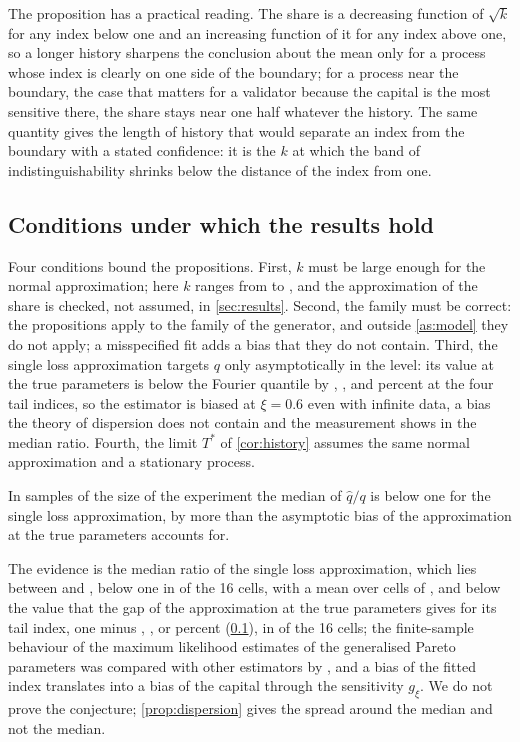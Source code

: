 The proposition has a practical reading. The share is a decreasing function of $\sqrt k$ for any index below one and an increasing function of it for any index above one, so a longer history sharpens the conclusion about the mean only for a process whose index is clearly on one side of the boundary; for a process near the boundary, the case that matters for a validator because the capital is the most sensitive there, the share stays near one half whatever the history.
The same quantity gives the length of history that would separate an index from the boundary with a stated confidence: it is the $k$ at which the band of indistinguishability shrinks below the distance of the index from one.

\subsection{Conditions under which the results hold}
\label{sec:theory-conditions}

Four conditions bound the propositions. First, $k$ must be large enough for the normal approximation; here $k$ ranges from \kMin{} to \kMax{}, and the approximation of the share is checked, not assumed, in \cref{sec:results}. Second, the family must be correct: the propositions apply to the family of the generator, and outside \cref{as:model} they do not apply; a misspecified fit adds a bias that they do not contain. Third, the single loss approximation targets $q$ only asymptotically in the level:
its value at the true parameters is below the Fourier quantile by \slGapA{}, \slGapB{}, \slGapC{} and \slGapD{} percent at the four tail indices, so the estimator is biased at $\xi=0.6$ even with infinite data, a bias the theory of dispersion does not contain and the measurement shows in the median ratio. Fourth, the limit $T^\ast$ of \cref{cor:history} assumes the same normal approximation and a stationary process.

\begin{conjecture}
\label{conj:bias}
In samples of the size of the experiment the median of $\hat q/q$ is below one for the single loss approximation, by more than the asymptotic bias of the approximation at the true parameters accounts for.
\end{conjecture}

The evidence is the median ratio of the single loss approximation, which lies between \slMedMin{} and \slMedMax{}, below one in \slBelowCells{} of the 16 cells, with a mean over cells of \slMeanMed{}, and below the value that the gap of the approximation at the true parameters gives for its tail index, one minus \slGapA{}, \slGapB{}, \slGapC{} or \slGapD{} percent (\cref{sec:theory-conditions}), in \slBelowGapCells{} of the 16 cells; the finite-sample behaviour of the maximum likelihood estimates of the generalised Pareto parameters was compared with other estimators by \citet{hosking1987}, and a bias of the fitted index translates into a bias of the capital through the sensitivity $g_\xi$.
We do not prove the conjecture; \cref{prop:dispersion} gives the spread around the median and not the median.
